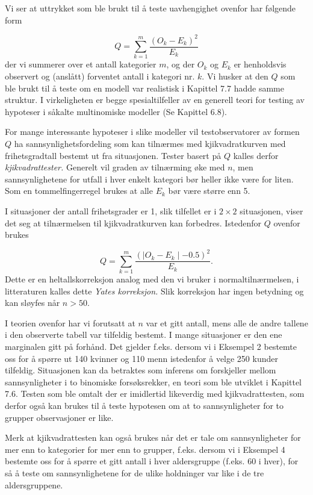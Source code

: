 Vi ser at uttrykket som ble brukt til å teste uavhengighet ovenfor
har følgende form

\[  Q=\sum_{k=1}^m \frac{{(O_k-E_k)}^2}{E_k}     \]
der vi summerer over et antall kategorier $m$, og der $O_k$ og $E_k$ er
henholdsvis observert og (anslått) forventet antall i kategori nr. $k$.
Vi husker at den $Q$ som ble brukt til å teste om en modell var
realistisk i Kapittel 7.7 hadde samme struktur.  I virkeligheten er 
begge spesialtilfeller av en generell teori for testing av hypoteser i
såkalte multinomiske modeller (Se Kapittel 6.8).

For mange interessante hypoteser i slike modeller vil testobservatorer
av formen $Q$ ha sannsynlighetsfordeling som kan tilnærmes med
kjikvadratkurven med frihetsgradtall bestemt ut fra situasjonen.  Tester
basert på $Q$ kalles derfor {\em kjikvadrattester.}  Generelt vil
graden av tilnærming øke med $n$, men sannsynlighetene for utfall
i hver enkelt kategori bør heller ikke være for liten.  Som en 
tommelfingerregel brukes at alle $E_k$ bør være større enn 5.

I situasjoner der antall frihetsgrader er 1, slik tilfellet er i
$2\times 2$ situasjonen, viser det seg at tilnærmelsen til
kjikvadratkurven kan forbedres.  Istedenfor $Q$ ovenfor brukes

\[  Q=\sum_{k=1}^m \frac{{(\mid O_k-E_k\mid -0.5)}^2}{E_k}.     \]
Dette er en heltallskorreksjon analog med den vi bruker i 
normaltilnærmelsen, i litteraturen kalles dette {\em Yates korreksjon.}
Slik korreksjon har ingen betydning og kan sløyfes når $n> 50$.

I teorien ovenfor har vi forutsatt at $n$ var et gitt antall, mens alle de
andre tallene i den observerte tabell var tilfeldig bestemt.
I mange situa\-sjoner er den ene marginalen gitt på forhånd.
Det gjelder f.eks. dersom vi i Eksempel 2 bestemte oss for å spørre
ut 140 kvinner og 110 menn istedenfor å velge 250 kunder tilfeldig.
Situasjonen kan da betraktes som inferens om forskjeller mellom
sannsynligheter i to binomiske forsøksrekker, en teori som ble utviklet 
i Kapittel 7.6. Testen som ble omtalt der er imid\-ler\-tid likeverdig med
kjikvadrattesten, som derfor også kan brukes til å teste
hypotesen om at to sannsynligheter for to grupper observasjoner er like.

Merk at kjikvadrattesten kan også brukes når det er tale om
sannsynligheter for mer enn to kategorier for mer enn to grupper, f.eks.
dersom vi i Eksempel 4 bestemte oss for å spørre et gitt antall
i hver aldersgruppe (f.eks. 60 i hver), for så å teste om
sannsynlighetene for de ulike holdninger var like i de tre aldersgruppene.

